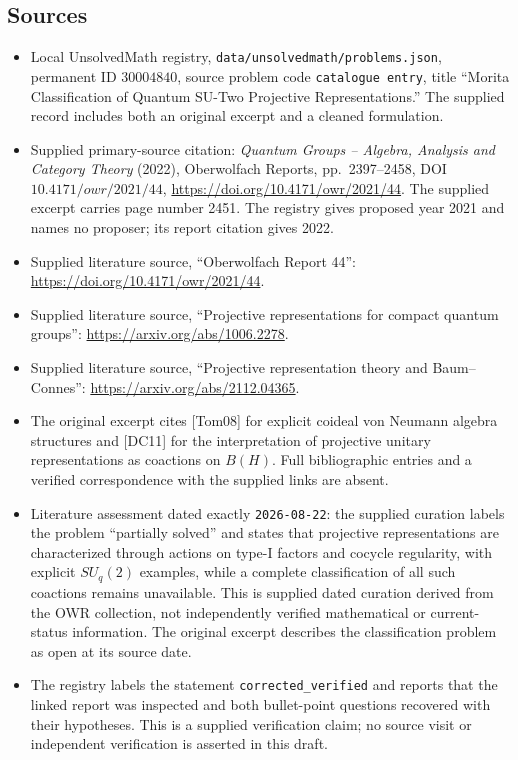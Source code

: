 \documentclass[11pt]{article}
\begin{document}
\subsection{Sources}
\begin{itemize}
\item Local UnsolvedMath registry, \texttt{data/unsolvedmath/problems.json}, permanent ID \(30004840\), source problem code \texttt{catalogue entry}, title ``Morita Classification of Quantum SU-Two Projective Representations.'' The supplied record includes both an original excerpt and a cleaned formulation.
\item Supplied primary-source citation: \emph{Quantum Groups -- Algebra, Analysis and Category Theory} (2022), Oberwolfach Reports, pp.\ 2397--2458, DOI \(10.4171/owr/2021/44\), \url{https://doi.org/10.4171/owr/2021/44}. The supplied excerpt carries page number 2451. The registry gives proposed year 2021 and names no proposer; its report citation gives 2022.
\item Supplied literature source, ``Oberwolfach Report 44'': \url{https://doi.org/10.4171/owr/2021/44}.
\item Supplied literature source, ``Projective representations for compact quantum groups'': \url{https://arxiv.org/abs/1006.2278}.
\item Supplied literature source, ``Projective representation theory and Baum--Connes'': \url{https://arxiv.org/abs/2112.04365}.
\item The original excerpt cites [Tom08] for explicit coideal von Neumann algebra structures and [DC11] for the interpretation of projective unitary representations as coactions on \(B(H)\). Full bibliographic entries and a verified correspondence with the supplied links are absent.
\item Literature assessment dated exactly \texttt{2026-08-22}: the supplied curation labels the problem ``partially solved'' and states that projective representations are characterized through actions on type-I factors and cocycle regularity, with explicit \(SU_q(2)\) examples, while a complete classification of all such coactions remains unavailable. This is supplied dated curation derived from the OWR collection, not independently verified mathematical or current-status information. The original excerpt describes the classification problem as open at its source date.
\item The registry labels the statement \texttt{corrected\_verified} and reports that the linked report was inspected and both bullet-point questions recovered with their hypotheses. This is a supplied verification claim; no source visit or independent verification is asserted in this draft.
\end{itemize}
\end{document}
